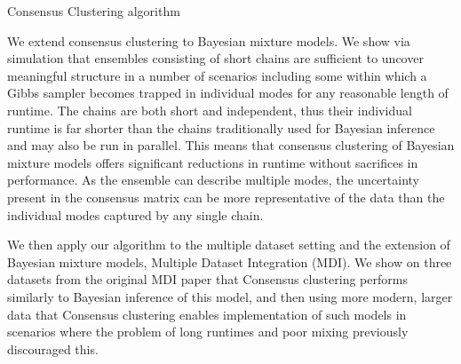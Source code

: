 \documentclass{bioinfo}
\begin{document}

\begin{algorithm} \label{algorithm:CC}
	\caption{Consensus Clustering algorithm}
\end{algorithm}

We extend consensus clustering to Bayesian mixture models. We show via simulation that ensembles consisting of short chains are sufficient to uncover meaningful structure in a number of scenarios including some within which a Gibbs sampler becomes trapped in individual modes for any reasonable length of runtime. The chains are both short and independent, thus their individual runtime is far shorter than the chains traditionally used for Bayesian inference and may also be run in parallel. This means that consensus clustering of Bayesian mixture models offers significant reductions in runtime without sacrifices in performance. As the ensemble can describe multiple modes, the uncertainty present in the consensus matrix can be more representative of the data than the individual modes captured by any single chain.

 We then apply our algorithm to the multiple dataset setting and the extension of Bayesian mixture models, Multiple Dataset Integration (MDI). We show on three datasets from the original MDI paper that Consensus clustering performs similarly to Bayesian inference of this model, and then using more modern, larger data that Consensus clustering enables implementation of such models in scenarios where the problem of long runtimes and poor mixing previously discouraged this. 
\end{document}
